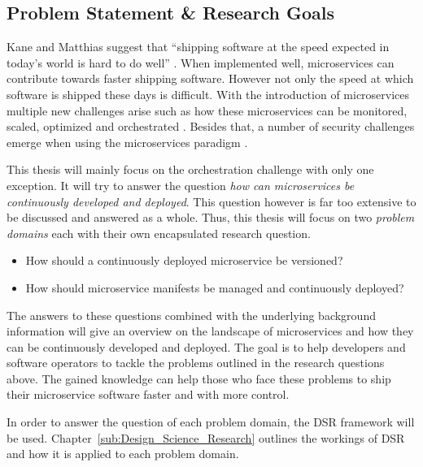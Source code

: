 
\subsection{Problem Statement \& Research Goals}%
\label{sub:Problem_Statement}

Kane and Matthias suggest that \enquote{shipping software at the speed expected
in today's world is hard to do well} \autocite[p.
2]{SeanPKaneDocker&Running2018}. When implemented well, microservices can
contribute towards faster shipping software. However not only the speed at
which software is shipped these days is difficult. With the introduction of
microservices multiple new challenges arise such as how these microservices can
be monitored, scaled, optimized and orchestrated \autocite[p.
67]{TrihinasDevOpsasService2018}. Besides that, a number of security challenges
emerge when using the microservices paradigm
\autocite{YaryginaOvercomingSecurityChallenges2018}.

This thesis will mainly focus on the orchestration challenge with only one
exception. It will try to answer the question \textit{how can microservices be
continuously developed and deployed}. This question however is far too
extensive to be discussed and answered as a whole. Thus, this thesis will focus
on two \textit{problem domains} each with their own encapsulated research
question.

\label{link:problem_domains}
\begin{itemize}
  \item How should a continuously deployed microservice be versioned?
  \item How should microservice manifests be managed and continuously deployed?
\end{itemize}

The answers to these questions combined with the underlying background
information will give an overview on the landscape of microservices and how
they can be continuously developed and deployed. The goal is to help developers
and software operators to tackle the problems outlined in the research
questions above. The gained knowledge can help those who face these problems to
ship their microservice software faster and with more control.

In order to answer the question of each problem domain, the \ac{DSR} framework
will be used. Chapter~\ref{sub:Design_Science_Research} outlines the workings
of \ac{DSR} and how it is applied to each problem domain.
